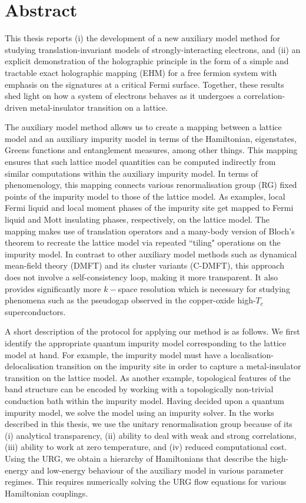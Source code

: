 \chapter*{Abstract}

This thesis reports (i) the development of a new auxiliary model method for studying translation-invariant models of strongly-interacting electrons, and (ii) an explicit demonstration of the holographic principle in the form of a simple and tractable exact holographic mapping (EHM) for a free fermion system with emphasis on the signatures at a critical Fermi surface. Together, these results shed light on how a system of electrons behaves as it undergoes a correlation-driven metal-insulator transition on a lattice.

The auxiliary model method allows us to create a mapping between a lattice model and an auxiliary impurity model in terms of the Hamiltonian, eigenstates, Greens functions and entanglement measures, among other things. This mapping ensures that such lattice model quantities can be computed indirectly from similar computations within the auxiliary impurity model. In terms of phenomenology, this mapping connects various renormalisation group (RG) fixed points of the impurity model to those of the lattice model. As examples, local Fermi liquid and local moment phases of the impurity site get mapped to Fermi liquid and Mott insulating phases, respectively, on the lattice model. The mapping makes use of translation operators and a many-body version of Bloch's theorem to recreate the lattice model via repeated ``tiling" operations on the impurity model. In contrast to other auxiliary model methods such as dynamical mean-field theory (DMFT) and its cluster variants (C-DMFT), this approach does not involve a self-consistency loop, making it more transparent. It also provides significantly more $k-$space resolution which is necessary for studying phenomena such as the pseudogap observed in the copper-oxide high-\(T_c\) superconductors. 

A short description of the protocol for applying our method is as follows. We first identify the appropriate quantum impurity model corresponding to the lattice model at hand. For example, the impurity model must have a localisation-delocalisation transition on the impurity site in order to capture a metal-insulator transition on the lattice model. As another example, topological features of the band structure can be encoded by working with a topologically non-trivial conduction bath within the impurity model. Having decided upon a quantum impurity model, we solve the model using an impurity solver. In the works described in this thesis, we use the unitary renormalisation group because of its (i) analytical transparency, (ii) ability to deal with weak and strong correlations, (iii) ability to work at zero temperature, and (iv) reduced computational cost. Using the URG, we obtain a hierarchy of Hamiltonians that describe the high-energy and low-energy behaviour of the auxiliary model in various parameter regimes. This requires numerically solving the URG flow equations for various Hamiltonian couplings.

